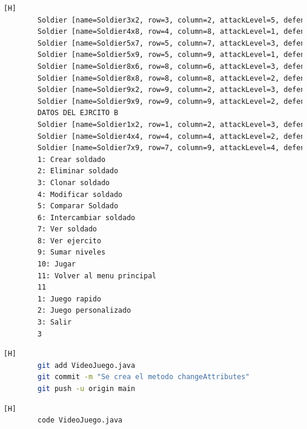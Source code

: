 \documentclass{article}
\begin{document}
\begin{lstlisting}[language=bash,caption={Compilando y probando el metodo changeAttribute  }][H]
		Soldier [name=Soldier3x2, row=3, column=2, attackLevel=5, defenseLevel=2, actualLife=2, speed=0, attitude=Repose, current=true]
		Soldier [name=Soldier4x8, row=4, column=8, attackLevel=1, defenseLevel=2, actualLife=3, speed=0, attitude=Repose, current=true]
		Soldier [name=Soldier5x7, row=5, column=7, attackLevel=3, defenseLevel=2, actualLife=1, speed=0, attitude=Repose, current=true]
		Soldier [name=Soldier5x9, row=5, column=9, attackLevel=1, defenseLevel=4, actualLife=1, speed=0, attitude=Repose, current=true]
		Soldier [name=Soldier8x6, row=8, column=6, attackLevel=3, defenseLevel=5, actualLife=4, speed=0, attitude=Repose, current=true]
		Soldier [name=Soldier8x8, row=8, column=8, attackLevel=2, defenseLevel=5, actualLife=3, speed=0, attitude=Repose, current=true]
		Soldier [name=Soldier9x2, row=9, column=2, attackLevel=3, defenseLevel=1, actualLife=4, speed=0, attitude=Repose, current=true]
		Soldier [name=Soldier9x9, row=9, column=9, attackLevel=2, defenseLevel=5, actualLife=2, speed=0, attitude=Repose, current=true]
		DATOS DEL EJRCITO B
		Soldier [name=Soldier1x2, row=1, column=2, attackLevel=3, defenseLevel=4, actualLife=4, speed=0, attitude=Repose, current=true]
		Soldier [name=Soldier4x4, row=4, column=4, attackLevel=2, defenseLevel=1, actualLife=5, speed=0, attitude=Repose, current=true]
		Soldier [name=Soldier7x9, row=7, column=9, attackLevel=4, defenseLevel=2, actualLife=1, speed=0, attitude=Repose, current=true]
		1: Crear soldado
		2: Eliminar soldado
		3: Clonar soldado
		4: Modificar soldado
		5: Comparar Soldado
		6: Intercambiar soldado
		7: Ver soldado
		8: Ver ejercito
		9: Sumar niveles
		10: Jugar
		11: Volver al menu principal
		11
		1: Juego rapido
		2: Juego personalizado
		3: Salir
		3
	\end{lstlisting}
	
	\begin{lstlisting}[language=bash,caption={Commit: 9277404a20d663b11bc7578ad51641619cca367a}][H]
		git add VideoJuego.java
		git commit -m "Se crea el metodo changeAttributes"			
		git push -u origin main
	\end{lstlisting}
	
	
	
	
	
	
	\begin{lstlisting}[language=bash,caption={Se implementa el método para comparar dos soldados }][H]
		code VideoJuego.java
	\end{lstlisting}
	
\end{document}
